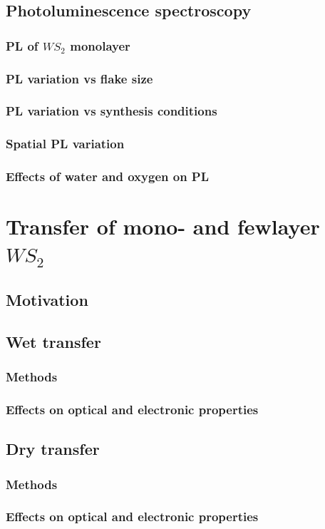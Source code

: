 \documentclass[12pt]{article}
\begin{document}
	\subsection{Photoluminescence spectroscopy}
		\subsubsection{PL of $WS_2$ monolayer}
		\subsubsection{PL variation vs flake size}
		\subsubsection{PL variation vs synthesis conditions}
		\subsubsection{Spatial PL variation}
		\subsubsection{Effects of water and oxygen on PL}
\section{Transfer of mono- and fewlayer $WS_2$}
	\subsection{Motivation}
	\subsection{Wet transfer}
		\subsubsection{Methods}
		\subsubsection{Effects on optical and electronic properties}
	\subsection{Dry transfer}
		\subsubsection{Methods}
		\subsubsection{Effects on optical and electronic properties}
\end{document}

